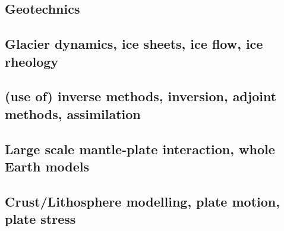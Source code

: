 \subsection*{Geotechnics}

\noindent
\cite{ster99}
\cite{gora03}
\cite{zhll03}
\cite{gour04}
\cite{gork06}
\cite{bufy14}

\subsection*{Glacier dynamics, ice sheets, ice flow, ice rheology}

\noindent
\cite{grev97}
\cite{frmm04}
\cite{asbl06}\cite{frmm06}
\cite{zhjg11}
\cite{pode12}
\cite{lejx14}
\cite{issg15}\cite{frlg15}
\cite{krab16}
\cite{lolc17}

\subsection*{(use of) inverse methods, inversion, adjoint methods, assimilation}

\noindent
\cite{cava98}
\cite{bomo01}\cite{kapo01}
\cite{buht03}
\cite{isst04}
\cite{isks07}
\cite{wama09}
\cite{wosp14}\cite{hobo14}
\cite{wahg15}
\cite{ghbu16}\cite{bocf16}
\cite{ligs17}
\cite{bofc18}

\subsection*{Large scale mantle-plate interaction, whole Earth models}

\cite{yufl85}
\cite{loja95}
\cite{wamg10}\cite{golw00}\cite{stgb10}
\cite{algs12}\cite{roct12}\cite{crtm12}
\cite{ghbh13}
\cite{macs16}
\cite{hulz18}

\subsection*{Crust/Lithosphere modelling, plate motion, plate stress}

